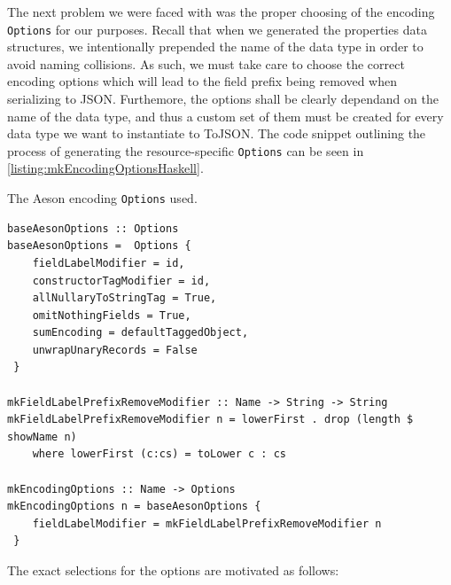 \documentclass[11pt]{report}
\begin{document}
The next problem we were faced with was the proper choosing of the encoding
\texttt{Options} for our purposes. Recall that when we generated the properties
data structures, we intentionally prepended the name of the data type in order to
avoid naming collisions. As such, we must take care to choose the correct
encoding options which will lead to the field prefix being removed
when serializing to JSON\@. Furthemore, the options shall be clearly dependand on
the name of the data type, and thus a custom set of them must be created for
every data type we want to instantiate to ToJSON\@. The code snippet outlining the
process of generating the resource-specific \texttt{Options} can be seen in
\autoref{listing:mkEncodingOptionsHaskell}.

\begin{listing}[H]
    \caption{The Aeson encoding \texttt{Options} used.}
\label{listing:mkEncodingOptionsHaskell}
\begin{verbatim}
baseAesonOptions :: Options
baseAesonOptions =  Options {
    fieldLabelModifier = id,
    constructorTagModifier = id,
    allNullaryToStringTag = True,
    omitNothingFields = True,
    sumEncoding = defaultTaggedObject,
    unwrapUnaryRecords = False
 }

mkFieldLabelPrefixRemoveModifier :: Name -> String -> String
mkFieldLabelPrefixRemoveModifier n = lowerFirst . drop (length $ showName n)
    where lowerFirst (c:cs) = toLower c : cs

mkEncodingOptions :: Name -> Options
mkEncodingOptions n = baseAesonOptions {
    fieldLabelModifier = mkFieldLabelPrefixRemoveModifier n
 }
\end{verbatim}
\end{listing}

The exact selections for the options are motivated as follows:
\end{document}
